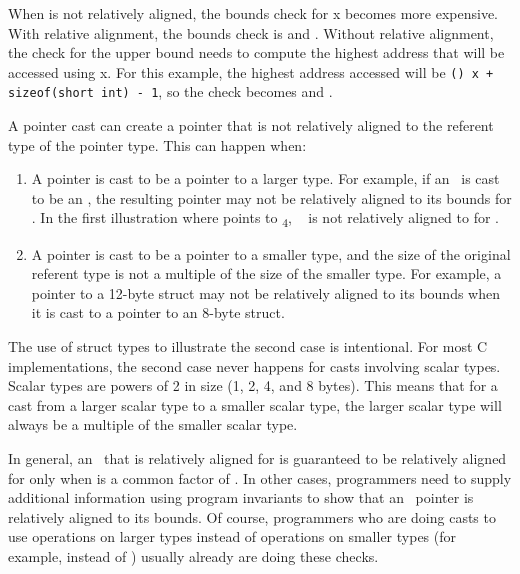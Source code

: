 When  is not relatively aligned, the bounds check for x
becomes more expensive. With relative alignment, the bounds check is
 and . Without relative
alignment, the check for the upper bound needs to compute the highest
address that will be accessed using x. For this example, the highest
address accessed will be
\lstinline|(|\arrayptrchar\lstinline|) x + sizeof(short int) - 1|, so the check becomes
 and .

A pointer cast can create a pointer that is not relatively aligned to
the referent type of the pointer type. This can happen when:

\begin{enumerate}
\item
  A pointer is cast to be a pointer to a larger type. For example, if an
  \ is cast to be an
  \arrayptrint , the resulting pointer
  may not be relatively aligned to its bounds for . In the
  first illustration where  points to \textsubscript{4},
  \arrayptrint\  is not relatively
  aligned to  for .
\item
  A pointer is cast to be a pointer to a smaller type, and the size of
  the original referent type is not a multiple of the size of the
  smaller type. For example, a pointer to a 12-byte struct may not be
  relatively aligned to its bounds when it is cast to a pointer to an
  8-byte struct.
\end{enumerate}

The use of struct types to illustrate the second case is intentional.
For most C implementations, the second case never happens for casts
involving scalar types. Scalar types are powers of 2 in size (1, 2, 4,
and 8 bytes). This means that for a cast from a larger scalar type to a
smaller scalar type, the larger scalar type will always be a multiple of
the smaller scalar type.

In general, an
\arrayptrT\ that is
relatively aligned for  is guaranteed to be relatively aligned
for  only
when  is a common factor of
. In other cases, programmers need to
supply additional information using program invariants to show that an
\arrayptr\ pointer is relatively aligned to its bounds. Of
course, programmers who are doing casts to use operations on larger
types instead of operations on smaller types (for example, 
instead of ) usually already are doing these checks.

